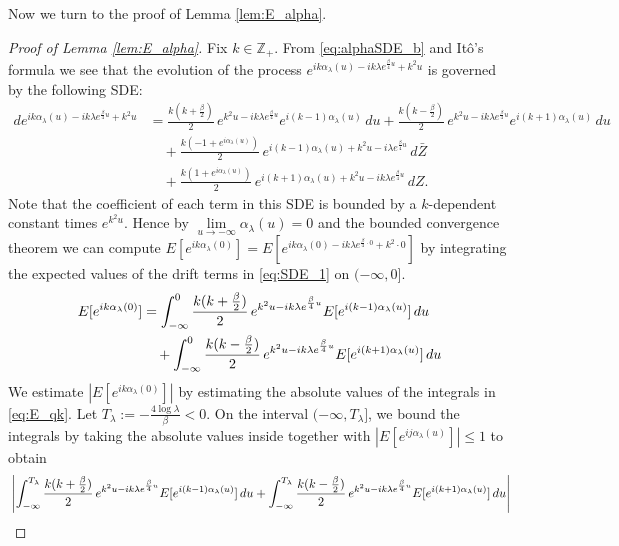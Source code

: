 \documentclass[12pt]{article}
\theoremstyle{definition} %
\newcommand{\Z}{{\mathbb Z}}
\theoremstyle{remark} %
\begin{document}
Now we turn to the proof of Lemma \ref{lem:E_alpha}. 
\begin{proof}[Proof of Lemma \ref{lem:E_alpha}]
Fix $k\in \Z_+$. From \eqref{eq:alphaSDE_b} and It\^o's formula we see that the evolution of the process $e^{i k \alpha_\lambda(u) - i k \lambda e^{\frac{\beta}{4}u} + k^2 u}$ is governed by the following SDE:
\begin{align}
    \label{eq:SDE_1}
    d e^{i k \alpha_\lambda(u) - i k \lambda e^{\frac{\beta}{4}u} + k^2 u}
    &= \frac{k(k+\frac{\beta}{2})}{2}\, e^{k^2 u - i k \lambda e^{\frac{\beta}{4}u}} e^{i (k-1)\alpha_\lambda(u)}\, du
     + \frac{k(k-\frac{\beta}{2})}{2}\, e^{k^2 u - i k \lambda e^{\frac{\beta}{4}u}} e^{i (k+1)\alpha_\lambda(u)}\, du \nonumber \\
    &\quad + \frac{k(-1+e^{i\alpha_\lambda(u)})}{2}\,
        e^{i(k-1)\alpha_\lambda(u) + k^2 u - i\lambda e^{\frac{\beta}{4}u}}\, d\bar{Z} \nonumber \\
    &\quad + \frac{k(1+e^{i\alpha_\lambda(u)})}{2}\,
        e^{i(k+1)\alpha_\lambda(u) + k^2 u - i k\lambda e^{\frac{\beta}{4}u}}\, dZ.
\end{align}
Note that the coefficient of each term in this SDE is bounded by a $k$-dependent constant times $e^{k^2 u}$. Hence by $\lim\limits_{u\to -\infty} \alpha_\lambda(u)=0$ and the bounded convergence theorem we can compute $E[e^{i k \alpha_\lambda(0)}]=E[e^{i k \alpha_\lambda(0) - i k \lambda e^{\frac{\beta}{4}\cdot 0} + k^2\cdot 0}]$ by integrating the expected values of the drift terms in \eqref{eq:SDE_1} on $(-\infty,0]$. 
\begin{align}\notag
   E[e^{i k \alpha_\lambda(0)}]&=\int_{-\infty}^0  \frac{k(k+\frac{\beta}{2})}{2}\, e^{k^2 u - i k \lambda e^{\frac{\beta}{4}u}} E[e^{i (k-1)\alpha_\lambda(u)}]\, du\\
   &\quad+\int_{-\infty}^0\frac{k(k-\frac{\beta}{2})}{2}\, e^{k^2 u - i k \lambda e^{\frac{\beta}{4}u}} E[e^{i (k+1)\alpha_\lambda(u)}]\, du
   \label{eq:E_qk}
\end{align}
We estimate $ | E[e^{i k \alpha_\lambda(0)}]|$ by estimating the absolute values of the integrals in \eqref{eq:E_qk}. 
Let $T_\lambda:=-\frac{4 \log \lambda}{\beta}< 0$. On the interval $(-\infty,T_\lambda]$, we bound the integrals by taking the absolute values inside together with $|E[e^{i j \alpha_\lambda(u)}]|\le 1$ to obtain
\begin{align}\notag
& \left| \int_{-\infty}^{T_\lambda}  \frac{k(k+\frac{\beta}{2})}{2}\, e^{k^2 u - i k \lambda e^{\frac{\beta}{4}u}} E[e^{i (k-1)\alpha_\lambda(u)}]\, du  +\int_{-\infty}^{T_\lambda}\frac{k(k-\frac{\beta}{2})}{2}\, e^{k^2 u - i k \lambda e^{\frac{\beta}{4}u}} E[e^{i (k+1)\alpha_\lambda(u)}]\, du\right|\\

\end{align}
\end{proof}
\end{document}
